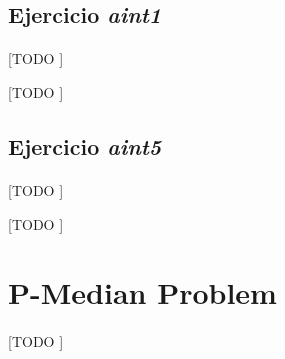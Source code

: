 \documentclass[spanish]{article}
\begin{document}
		\subsection{Ejercicio \emph{aint1}}
		\label{sec:e-7a}

			\paragraph{}
			[TODO ]

			\begin{table}[p]
				\begin{center}
				\end{center}
				\caption{[TODO ]}
				\label{}
			\end{table}

		\subsection{Ejercicio \emph{aint5}}
		\label{sec:e-7b}

			\paragraph{}
			[TODO ]

			\begin{table}[p]
				\begin{center}
				\end{center}
				\caption{[TODO ]}
				\label{}
			\end{table}


	\section{P-Median Problem}
	\label{sec:e-8}

		\paragraph{}
		[TODO ]
\end{document}
